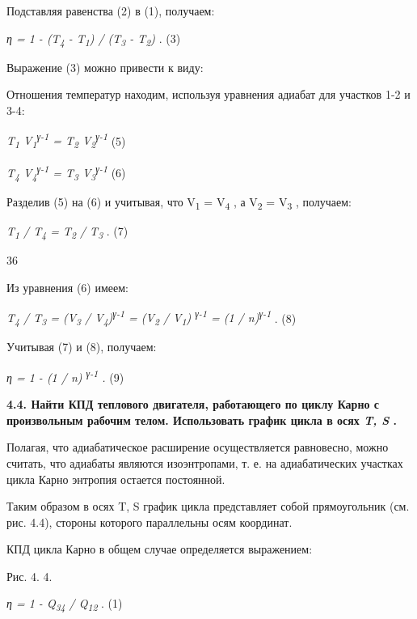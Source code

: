 Подставляя равенства (2) в (1), получаем:

\emph{η = 1 - (T\textsubscript{4} - T\textsubscript{1}) /
(T\textsubscript{3} - T\textsubscript{2})} . (3)

Выражение (3) можно привести к виду:


Отношения температур находим, используя уравнения адиабат для участков
1-2 и 3-4:

\emph{T\textsubscript{1} V\textsubscript{1}\textsuperscript{γ-1} =
T\textsubscript{2} V\textsubscript{2}\textsuperscript{γ-1}} (5)

\emph{T\textsubscript{4} V\textsubscript{4}\textsuperscript{γ-1} =
T\textsubscript{3} V\textsubscript{3}\textsuperscript{γ-1}} (6)

Разделив (5) на (6) и учитывая, что V\textsubscript{1} =
V\textsubscript{4} , а V\textsubscript{2} = V\textsubscript{3} ,
получаем:

\emph{T\textsubscript{1} / T\textsubscript{4} = T\textsubscript{2} /
T\textsubscript{3}} . (7)

36

Из уравнения (6) имеем:

\emph{T\textsubscript{4} / T\textsubscript{3} = (V\textsubscript{3} /
V\textsubscript{4})\textsuperscript{γ-1} = (V\textsubscript{2} /
V\textsubscript{1}) \textsuperscript{γ-1} = (1 /
n)\textsuperscript{γ-1}} . (8)

Учитывая (7) и (8), получаем:

\emph{η = 1 - (1 / n) \textsuperscript{γ-1} .} (9)

\textbf{4.4. Найти КПД теплового двигателя, работающего по циклу Карно с
произвольным рабочим телом. Использовать график цикла в осях \emph{T, S}
.}

\solving{}

Полагая, что адиабатическое расширение осуществляется равновесно, можно
считать, что адиабаты являются изоэнтропами, т. е. на адиабатических
участках цикла Карно энтропия остается постоянной.

Таким образом в осях T, S график цикла представляет собой прямоугольник
(см. рис. 4.4), стороны которого параллельны осям координат.

КПД цикла Карно в общем случае определяется выражением:

Рис. 4. 4.

\emph{η = 1 - Q\textsubscript{34} / Q\textsubscript{12}} . (1)

